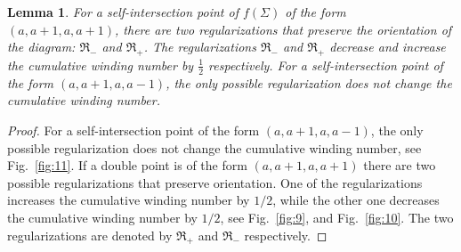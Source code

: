 \documentclass[12pt]{amsart}
\newtheorem{lemma}[theorem]{Lemma}
\theoremstyle{definition}
\begin{document}
{\begin{lemma} For a self-intersection point of $f(\Sigma)$ of the form $(a, a+1, a, a+1)$,  there are two regularizations that preserve the orientation of the diagram: $\Re_-$ and $\Re_+$.  The regularizations $\Re_-$ and $\Re_+$ decrease and increase the cumulative winding number by $\frac{1}{2}$  respectively.  For a self-intersection point of the form $(a, a+1, a, a-1)$,  the only possible regularization does not change the cumulative winding number. 
\end{lemma}
\begin{proof} For a self-intersection point of the form $(a, a+1, a, a-1)$,  the only possible regularization does not change the cumulative winding number, see Fig.~\ref{fig:11}.   If a double point is of the form  $(a, a+1, a, a+1)$ there are two possible regularizations that preserve orientation.  One of the regularizations increases the cumulative winding number by $1/2$, while the other one decreases the cumulative winding number by $1/2$, see Fig.~\ref{fig:9}, and Fig.~\ref{fig:10}. The two regularizations are denoted by $\Re_+$ and $\Re_-$ respectively. 
\iffalse 


\end{proof}}
\end{document}
